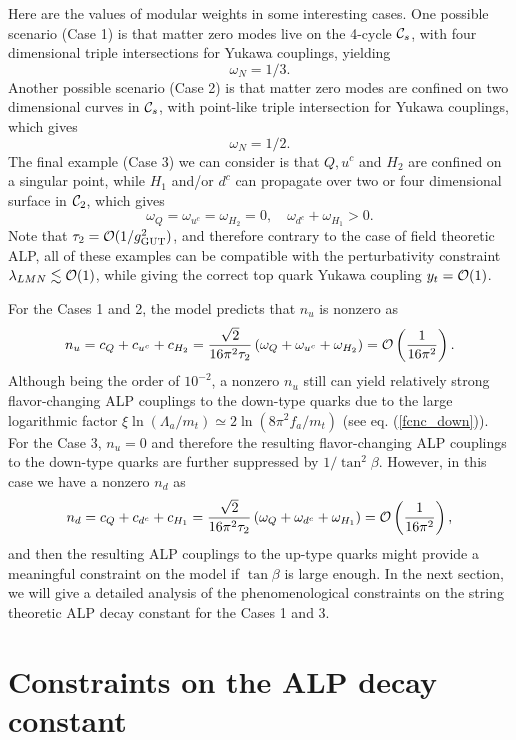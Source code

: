 \documentclass[preprint,prd,aps,tighten,nofootinbib,amssymb]{revtex4}
\newcommand{\dis}[1]{\begin{equation}\begin{split}#1\end{split}\end{equation}}
\begin{document}
Here are the values of modular weights in some interesting cases. One possible scenario (Case 1) is that matter zero modes live on the 4-cycle ${\cal C}_s$, with four dimensional triple intersections for Yukawa couplings, yielding  $$\omega_N=1/3.$$
Another possible scenario (Case 2) is that  matter zero modes are confined on two dimensional  curves in ${\cal C}_s$, with point-like triple intersection for Yukawa couplings, which gives $$\omega_N=1/2.$$
The final example (Case 3) we can consider
is that $Q, u^c$ and $H_2$ are confined on a singular point, while $H_1$ and/or $d^c$ can propagate over two or four dimensional surface in ${\cal C}_2$, which gives $$\omega_Q=\omega_{u^c}=\omega_{H_2}=0,  \quad \omega_{d^c}+\omega_{H_1}>0.$$
Note that $\tau_2={\cal O}(1/g_{\rm GUT}^2)$, and therefore contrary to the case of field theoretic ALP, all of these examples can be compatible with the perturbativity constraint $\lambda_{LMN}\lesssim {\cal O}(1)$, while giving the correct top quark Yukawa coupling $y_t={\cal O}(1)$.  
     
For the Cases 1 and 2, the model predicts that $n_u$ is nonzero as
\dis{
 n_u=c_Q+c_{u^c}+c_{H_2}=\frac{\sqrt{2}}{16\pi^2 \tau_2} \left(\omega_{Q}+\omega_{u^c}+\omega_{H_2} \right)={\cal O}\left(\frac{1}{16\pi^2}\right).} Although being the order of $10^{-2}$, a nonzero $n_u$ still can  yield  relatively strong flavor-changing ALP couplings to the down-type quarks due to the large logarithmic factor $\xi\ln(\Lambda_a/m_t)\simeq 2\ln(8\pi^2 f_a/m_t)$ (see eq. (\ref{fcnc_down})).
For the Case 3, $n_u=0$ and therefore the resulting flavor-changing ALP couplings to the down-type quarks are further suppressed by $1/\tan^2\beta$. However, in this case we have a nonzero $n_d$ as  
\dis{
n_d=c_Q+c_{d^c}+c_{H_1}=\frac{\sqrt{2}}{16\pi^2 \tau_2} \left(\omega_{Q}+\omega_{d^c}+\omega_{H_1}\right)={\cal O}\left(\frac{1}{16\pi^2}\right), } 
and then the resulting  ALP couplings to the up-type quarks might provide a meaningful constraint on the model if  $\tan\beta$ is large enough. 
In the next section, we will give a detailed analysis of the phenomenological constraints on the string theoretic ALP decay constant for the Cases 1 and 3.



\section{Constraints on the ALP decay constant} \label{sec:Analysis}
\end{document}
